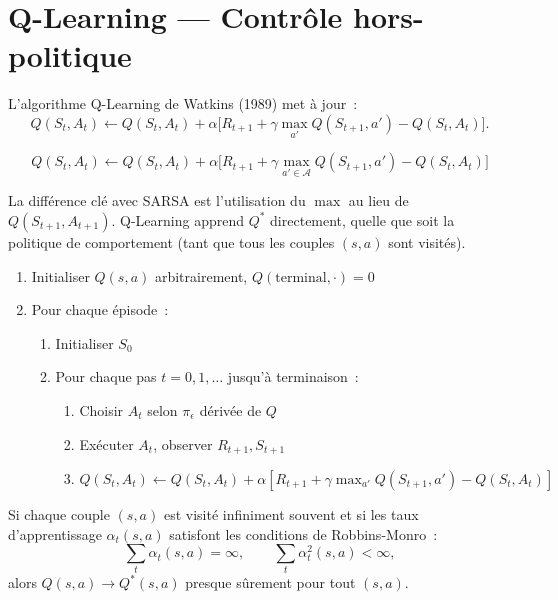 \section{Q-Learning --- Contr\^ole hors-politique}

\begin{definition}[Q-Learning]
L'algorithme Q-Learning de Watkins (1989) met \`a jour~:
\[
    Q(S_t, A_t) \leftarrow Q(S_t, A_t) + \alpha \big[
    R_{t+1} + \gamma \max_{a'} Q(S_{t+1}, a') - Q(S_t, A_t) \big].
\]
\end{definition}

\begin{formules}[title=\textbf{Mise \`a jour Q-Learning}]
\[
    Q(S_t, A_t) \leftarrow Q(S_t, A_t) + \alpha \Big[
    R_{t+1} + \gamma \max_{a' \in \mathcal{A}} Q(S_{t+1}, a') - Q(S_t, A_t) \Big]
\]
\end{formules}

La diff\'erence cl\'e avec SARSA est l'utilisation du $\max$ au lieu de $Q(S_{t+1}, A_{t+1})$.
Q-Learning apprend $Q^*$ directement, quelle que soit la politique de comportement
(tant que tous les couples $(s,a)$ sont visit\'es).

\begin{algorithme}[title=\textbf{Q-Learning}]
\begin{enumerate}
    \item Initialiser $Q(s,a)$ arbitrairement, $Q(\text{terminal}, \cdot) = 0$
    \item Pour chaque \'episode~:
    \begin{enumerate}
        \item Initialiser $S_0$
        \item Pour chaque pas $t = 0, 1, \ldots$ jusqu'\`a terminaison~:
        \begin{enumerate}
            \item Choisir $A_t$ selon $\pi_\epsilon$ d\'eriv\'ee de $Q$
            \item Ex\'ecuter $A_t$, observer $R_{t+1}, S_{t+1}$
            \item $Q(S_t, A_t) \leftarrow Q(S_t, A_t) + \alpha[R_{t+1} + \gamma \max_{a'} Q(S_{t+1}, a') - Q(S_t, A_t)]$
        \end{enumerate}
    \end{enumerate}
\end{enumerate}
\end{algorithme}

\begin{theoreme}
\label{thm:q_learning_conv}
Si chaque couple $(s,a)$ est visit\'e infiniment souvent et si les taux
d'apprentissage $\alpha_t(s,a)$ satisfont les conditions de Robbins-Monro~:
\[
    \sum_t \alpha_t(s,a) = \infty, \qquad \sum_t \alpha_t^2(s,a) < \infty,
\]
alors $Q(s,a) \to Q^*(s,a)$ presque s\^urement pour tout $(s,a)$.
\end{theoreme}

